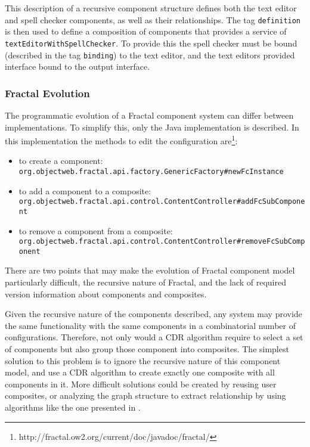 This description of a recursive component structure defines both the text editor and spell checker components, as well as their relationships.
The tag \verb+definition+ is then used to define a composition of components that provides a service of \verb+textEditorWithSpellChecker+.
To provide this the spell checker must be bound (described in the tag \verb+binding+) to the text editor,
and the text editors provided interface bound to the output interface. 

\subsubsection{Fractal Evolution}
The programmatic evolution of a Fractal component system can differ between implementations.
To simplify this, only the Java implementation is described. 
In this implementation the methods to edit the configuration are\footnote{http://fractal.ow2.org/current/doc/javadoc/fractal/}:
\begin{itemize}
  \item to create a component: \\ \verb+org.objectweb.fractal.api.factory.GenericFactory#newFcInstance+
  \item to add a component to a composite: \\ \verb+org.objectweb.fractal.api.control.ContentController#addFcSubComponent+
  \item to remove a component from a composite: \\ \verb+org.objectweb.fractal.api.control.ContentController#removeFcSubComponent+
\end{itemize}

There are two points that may make the evolution of Fractal component model particularly difficult,
the recursive nature of Fractal, and the lack of required version information about components and composites.

Given the recursive nature of the components described, any system may provide the same functionality with the same components in a combinatorial number of configurations.
Therefore, not only would a CDR algorithm require to select a set of components but also group those component into composites.
The simplest solution to this problem is to ignore the recursive nature of this component model,
and use a CDR algorithm to create exactly one composite with all components in it.
More difficult solutions could be created by reusing user composites,
or analyzing the graph structure to extract relationship by using algorithms like the one presented in \citep{dietrich2008cluster}.

